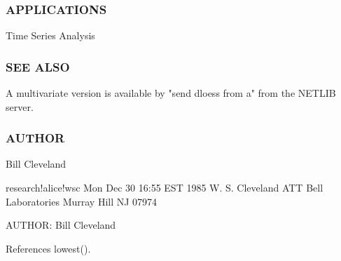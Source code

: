 \subsubsection*{A\+P\+P\+L\+I\+C\+A\+T\+I\+O\+NS}

\begin{DoxyVerb} Time Series Analysis
\end{DoxyVerb}


\subsubsection*{S\+EE A\+L\+SO}

\begin{DoxyVerb}A multivariate version is available by "send dloess from a"
from the NETLIB server.
\end{DoxyVerb}


\subsubsection*{A\+U\+T\+H\+OR}

\begin{DoxyVerb}Bill Cleveland

 research!alice!wsc Mon Dec 30 16:55 EST 1985
 W. S. Cleveland
 ATT Bell Laboratories
 Murray Hill NJ 07974 \end{DoxyVerb}


A\+U\+T\+H\+OR\+: Bill Cleveland 

References lowest().

\mbox{\label{namespacem__math_a06b587e00199906f1f87f1a7b101d71f}} 
